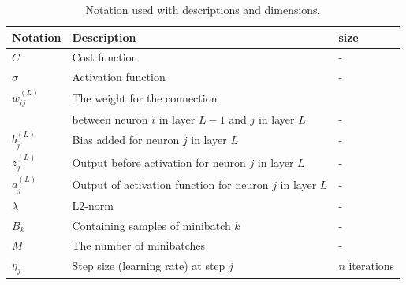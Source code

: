 \documentclass[11pt]{article}
\begin{document}
\begin{table}[H]
    \begin{small}
        \caption{Notation used with descriptions and dimensions. }
        \label{tab:}
        \begin{center}
            \begin{tabular}{|l|l|l|}
                \hline
                Notation       & Description                                               & size                                \\
                \hline
                $C$            & Cost function                                             & -                                   \\
                \hline
                $\sigma$       & Activation function                                       & -                                   \\
                \hline
                $w_{ij}^{(L)}$ & The weight for the connection                             &                                     \\                     & between neuron $i$ in layer $L-1$   and $j$ in layer $L$ & - \\
                \hline
                $b_j^{(L)}$    & Bias added for neuron $j$ in layer $L$                    & -                                   \\
                \hline
                $z_j^{(L)}$    & Output before activation for neuron $j$ in layer $L$      & -                                   \\
                \hline
                $a_j^{(L)}$    & Output of activation function for neuron $j$ in layer $L$ & -                                   \\
                \hline
                $\lambda$      & L2-norm                                                   & -                                   \\
                \hline
                $B_k$          & Containing samples of minibatch $k$                       & -                                   \\
                \hline
                $M$            & The number of minibatches                                 & -                                   \\
                \hline
                $\eta_j$       & Step size (learning rate) at step $j$                     & $n$ iterations                      \\

\end{tabular}
\end{center}
\end{small}
\end{table}
\end{document}
